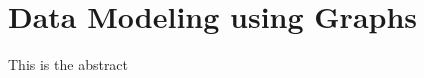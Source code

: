 \chapter{Data Modeling using Graphs}

\begin{Abstract}
	\begin{changemargin}{1cm}{1cm}
		This is the abstract
	\end{changemargin}
\end{Abstract}